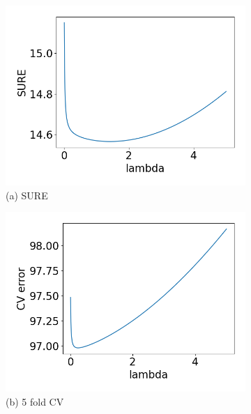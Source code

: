 \captionsetup[subfigure]{labelformat=empty}
\begin{figure}[t!]
\centering
\begin{subfigure}[b]{.24\columnwidth} 
    \includegraphics[width=\columnwidth]{../fig/collinear_sure_obj_81.png}
    \caption{(a) SURE}
\end{subfigure}
\hfill
\centering
\begin{subfigure}[b]{.24\columnwidth} 
    \includegraphics[width=\columnwidth]{../fig/collinear_5fold_obj_81.png}
    \caption{(b) 5 fold CV}
\end{subfigure}
\hfill
\centering
\begin{subfigure}[b]{.24\columnwidth} 

\end{subfigure}
\end{figure}
